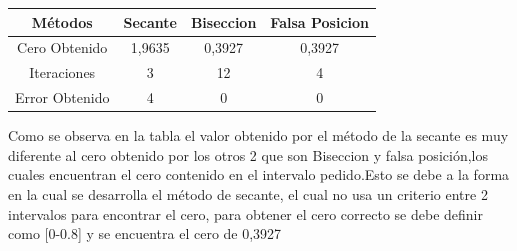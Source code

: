 \documentclass{udparticle}
\begin{document}
\begin{enumerate}
\begin{enumerate}
        \begin{table}[H]
        \centering
            \begin{tabular} { |c|c|c|c|}
            
            \hline
            Métodos       & Secante & Biseccion & Falsa Posicion \\
            \hline
            Cero Obtenido &  1,9635       &    0,3927       &      0,3927           \\
            \hline
            Iteraciones   &     3        &      12     &        4         \\
            \hline
            Error Obtenido &     4      &     0        &    0  \\
            \hline
            
            \end{tabular}
        \end{table}
        Como se observa en la tabla el valor obtenido por el método de la secante es muy diferente al cero 
        obtenido por los otros 2 que son Biseccion y falsa posición,los cuales encuentran el cero contenido en el intervalo pedido.Esto se debe a la forma en la cual se desarrolla el método de secante, el cual no usa un criterio entre 2 intervalos para encontrar el cero, para obtener el cero correcto se debe definir como [0-0.8] y se encuentra el cero de 0,3927    
        
    \newpage
        
        
    

\end{enumerate}
\end{enumerate}
\end{document}
